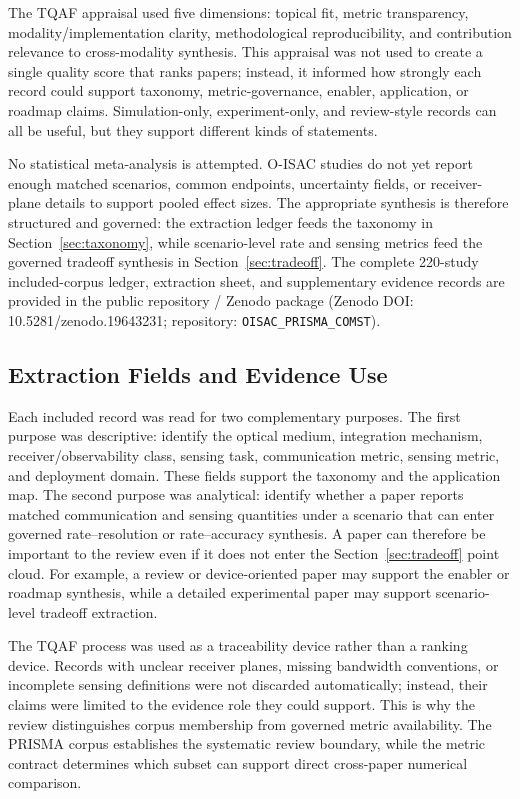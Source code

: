 \documentclass[letterpaper,journal]{IEEEtran}
\begin{document}
The TQAF appraisal used five dimensions: topical fit, metric transparency, modality/implementation clarity, methodological reproducibility, and contribution relevance to cross-modality synthesis. This appraisal was not used to create a single quality score that ranks papers; instead, it informed how strongly each record could support taxonomy, metric-governance, enabler, application, or roadmap claims. Simulation-only, experiment-only, and review-style records can all be useful, but they support different kinds of statements.

No statistical meta-analysis is attempted. O-ISAC studies do not yet report enough matched scenarios, common endpoints, uncertainty fields, or receiver-plane details to support pooled effect sizes. The appropriate synthesis is therefore structured and governed: the extraction ledger feeds the taxonomy in Section~\ref{sec:taxonomy}, while scenario-level rate and sensing metrics feed the governed tradeoff synthesis in Section~\ref{sec:tradeoff}. The complete 220-study included-corpus ledger, extraction sheet, and supplementary evidence records are provided in the public repository / Zenodo package (Zenodo DOI: 10.5281/zenodo.19643231; repository: \texttt{OISAC\_PRISMA\_COMST}).

\subsection{Extraction Fields and Evidence Use}

Each included record was read for two complementary purposes. The first purpose was descriptive: identify the optical medium, integration mechanism, receiver/observability class, sensing task, communication metric, sensing metric, and deployment domain. These fields support the taxonomy and the application map. The second purpose was analytical: identify whether a paper reports matched communication and sensing quantities under a scenario that can enter governed rate--resolution or rate--accuracy synthesis. A paper can therefore be important to the review even if it does not enter the Section~\ref{sec:tradeoff} point cloud. For example, a review or device-oriented paper may support the enabler or roadmap synthesis, while a detailed experimental paper may support scenario-level tradeoff extraction.

The TQAF process was used as a traceability device rather than a ranking device. Records with unclear receiver planes, missing bandwidth conventions, or incomplete sensing definitions were not discarded automatically; instead, their claims were limited to the evidence role they could support. This is why the review distinguishes corpus membership from governed metric availability. The PRISMA corpus establishes the systematic review boundary, while the metric contract determines which subset can support direct cross-paper numerical comparison.
\end{document}
